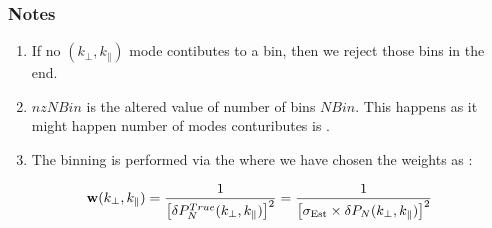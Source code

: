 \documentclass[a4paper,11pt,oneside,english,openany]{sphinxmanual}
\begin{document}
\begin{fulllineitems}
\subsubsection*{Notes}
\begin{enumerate}
%
\item {} 
\sphinxAtStartPar
If no \((k_{\perp},k_{\parallel})\) mode contibutes to a bin, then we reject those bins in the end.

\item {} 
\sphinxAtStartPar
\({nzN\!Bin}\) is the altered value of number of bins \(N\!Bin\). This happens as it might happen number of modes contuributes is .

\item {} 
\sphinxAtStartPar
The binning is performed via the  where we have chosen the weights as :

\end{enumerate}
\begin{equation*}
\begin{split}\mathbf{w}(k_{\perp},k_{\parallel}) = \frac{1}{\left[\delta P_N^{True}(k_{\perp},k_{\parallel})\right]^2} = \frac{1}{\left[\sigma_{\rm Est}\times\delta P_N(k_{\perp},k_{\parallel})\right]^2}\end{split}
\end{equation*}
\clearpage

\end{fulllineitems}

\end{document}
